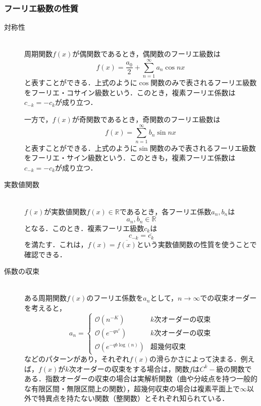 \documentclass[11pt,a4paper]{jsarticle}
\theoremstyle{definition}
\begin{document}
\subsubsection{フーリエ級数の性質}
\begin{description}
  \item[対称性]
    \quad\\
    周期関数$f(x)$が偶関数であるとき，偶関数のフーリエ級数は
    \begin{equation*}
      f(x)=\frac{a_0}{2} + \sum_{n=1}^{\infty} a_n \cos nx \
    \end{equation*}
    と表すことができる．上式のように$\cos$関数のみで表されるフーリエ級数をフーリエ・コサイン級数という．このとき，複素フーリエ係数は$c_{-k}=-c_k$が成り立つ．

    一方で，$f(x)$が奇関数であるとき，奇関数のフーリエ級数は
    \begin{equation*}
      f(x) = \sum_{n=1}^{\infty} b_n \sin nx \
    \end{equation*}
    と表すことができる．上式のように$\sin$関数のみで表されるフーリエ級数をフーリエ・サイン級数という．このときも，複素フーリエ係数は$c_{-k}=-c_k$が成り立つ．

  \item[実数値関数]
    \quad\\
    $f(x)$が実数値関数$f(x)\in \mathbb{R}$であるとき，各フーリエ係数$a_n,b_n$は
    \begin{equation*}
      a_n,b_n\in\mathbb{R}
    \end{equation*}
    となる．このとき．複素フーリエ級数$c_k$は
    \begin{equation*}
      c_{-k}=\overline{c_k}
    \end{equation*}
    を満たす．これは，$f(x)=\overline{f(x)}$という実数値関数の性質を使うことで確認できる．

  \item[係数の収束]
    \quad\\
    ある周期関数$f(x)$のフーリエ係数を$a_n$として，$n\rightarrow \infty$での収束オーダーを考えると，
    \begin{equation*}
      a_n = \begin{cases}
        \mathcal{O}\left(n^{-K}\right)          & k次オーダーの収束 \\
        \mathcal{O}\left(e^{-qn^r}\right)       & k次オーダーの収束 \\
        \mathcal{O}\left(e^{-qb\log (n)}\right) & 超幾何収束
      \end{cases}
    \end{equation*}
    などのパターンがあり，それぞれ$f(x)$の滑らかさによって決まる．例えば，$f(x)$が$k$次オーダーの収束をする場合は，関数$f$は$C^k-級$の関数である．指数オーダーの収束の場合は実解析関数（曲や分岐点を持つ一般的な有限区間・無限区間上の関数），超幾何収束の場合は複素平面上で$\infty$以外で特異点を持たない関数（整関数）とそれぞれ知られている．


\end{description}
\end{document}
